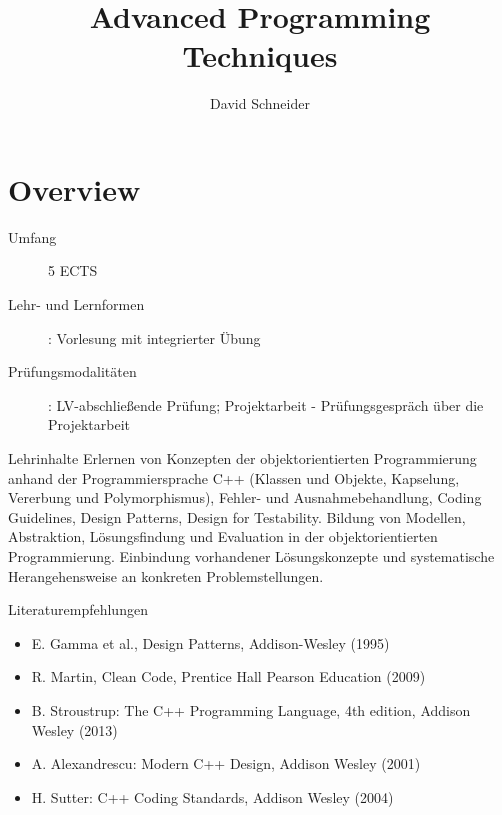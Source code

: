 \documentclass{beamer}
\title{Advanced Programming Techniques}
\author{David Schneider}
\begin{document}
\frame{\titlepage}

\part{Overview}

\begin{frame}
\begin{description}
\item[Umfang] 5 ECTS
\item[Lehr- und Lernformen]: Vorlesung mit integrierter Übung
\item[Prüfungsmodalitäten]: LV-abschließende Prüfung; Projektarbeit - Prüfungsgespräch über die Projektarbeit
\end{description}
\end{frame}

\begin{frame}{Lehrinhalte}
Erlernen von Konzepten der objektorientierten Programmierung anhand der
Programmiersprache C++ (Klassen und Objekte, Kapselung, Vererbung und
Polymorphismus), Fehler- und Ausnahmebehandlung, Coding Guidelines, Design
Patterns, Design for Testability. Bildung von Modellen, Abstraktion,
Lösungsfindung und Evaluation in der  objektorientierten Programmierung.
Einbindung vorhandener Lösungskonzepte und systematische Herangehensweise an
konkreten Problemstellungen.
\end{frame}

\begin{frame}{Literaturempfehlungen}
\begin{itemize}
\item E. Gamma et al., Design Patterns, Addison-Wesley (1995)
\item R. Martin, Clean Code, Prentice Hall Pearson Education (2009)
\item B. Stroustrup: The C++ Programming Language, 4th edition, Addison Wesley
(2013)
\item A. Alexandrescu: Modern C++ Design, Addison Wesley (2001)
\item H. Sutter: C++ Coding Standards, Addison Wesley (2004)
\end{itemize}
\end{frame}
\end{document}
